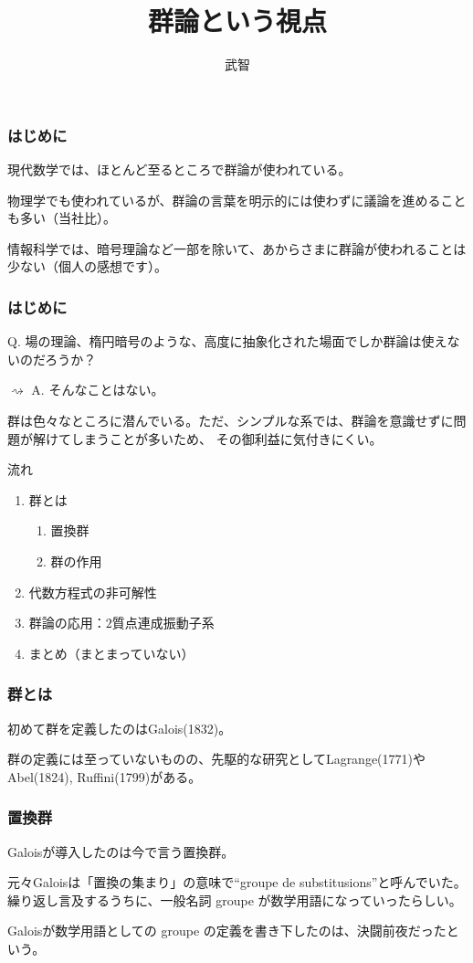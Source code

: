 \documentclass[12pt, t]{beamer}
\title{群論という視点}
\author{武智}
\begin{document}
\frame{\maketitle}

\begin{frame}
\frametitle{はじめに}
現代数学では、ほとんど至るところで群論が使われている。

物理学でも使われているが、群論の言葉を明示的には使わずに議論を進めることも多い（当社比）。

情報科学では、暗号理論など一部を除いて、あからさまに群論が使われることは少ない（個人の感想です）。
\end{frame}

\begin{frame}
\frametitle{はじめに}
Q. 場の理論、楕円暗号のような、高度に抽象化された場面でしか群論は使えないのだろうか？

$\rightsquigarrow$ A. そんなことはない。

群は色々なところに潜んでいる。ただ、シンプルな系では、群論を意識せずに問題が解けてしまうことが多いため、
その御利益に気付きにくい。
\end{frame}


\begin{frame}{流れ}
\begin{enumerate}
\item 群とは
\begin{enumerate}
\item 置換群
\item 群の作用
\end{enumerate}
\item 代数方程式の非可解性
\item 群論の応用：$2$質点連成振動子系
\item まとめ（まとまっていない）
\end{enumerate}
\end{frame}

\begin{frame}
\frametitle{群とは}
初めて群を定義したのはGalois(1832)。

群の定義には至っていないものの、先駆的な研究としてLagrange(1771)やAbel(1824), Ruffini(1799)がある。

\end{frame}

\begin{frame}
\frametitle{置換群}
Galoisが導入したのは今で言う置換群。

元々Galoisは「置換の集まり」の意味で``groupe de substitusions''と呼んでいた。
繰り返し言及するうちに、一般名詞 groupe が数学用語になっていったらしい。

Galoisが数学用語としての groupe の定義を書き下したのは、決闘前夜だったという\cite{Neumann2011}。
\end{frame}
\end{document}
